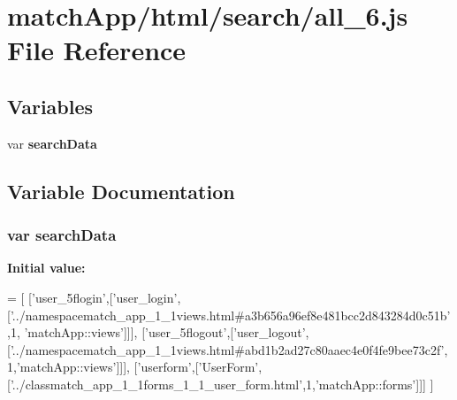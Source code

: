 \section{match\+App/html/search/all\+\_\+6.js File Reference}
\label{all__6_8js}
\subsection*{Variables}
\begin{DoxyCompactItemize}
\item 
var {\bf search\+Data}
\end{DoxyCompactItemize}


\subsection{Variable Documentation}
\subsubsection[{search\+Data}]{\setlength{\rightskip}{0pt plus 5cm}var search\+Data}\label{all__6_8js_ad01a7523f103d6242ef9b0451861231e}
{\bfseries Initial value\+:}
\begin{DoxyCode}
=
[
  [\textcolor{stringliteral}{'user\_5flogin'},[\textcolor{stringliteral}{'user\_login'},[\textcolor{stringliteral}{'../namespacematch\_app\_1\_1views.html#a3b656a96ef8e481bcc2d843284d0c51b'},1,\textcolor{stringliteral}{
      'matchApp::views'}]]],
  [\textcolor{stringliteral}{'user\_5flogout'},[\textcolor{stringliteral}{'user\_logout'},[\textcolor{stringliteral}{'../namespacematch\_app\_1\_1views.html#abd1b2ad27c80aaec4e0f4fe9bee73c2f'},
      1,\textcolor{stringliteral}{'matchApp::views'}]]],
  [\textcolor{stringliteral}{'userform'},[\textcolor{stringliteral}{'UserForm'},[\textcolor{stringliteral}{'../classmatch\_app\_1\_1forms\_1\_1\_user\_form.html'},1,\textcolor{stringliteral}{'matchApp::forms'}]]]
]
\end{DoxyCode}
